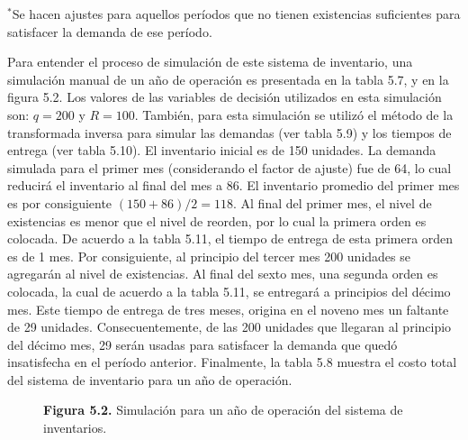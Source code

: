 \documentclass[11pt,letterpaper]{report}
\begin{document}
{\footnotesize $^{*}$Se hacen ajustes para aquellos períodos que no tienen
existencias suficientes para satisfacer la demanda de ese período.}

Para entender el proceso de simulación de este sistema de inventario, una
simulación manual de un año de operación es presentada en la tabla 5.7, y en
la figura 5.2. Los valores de las variables de decisión utilizados en esta
simulación son: $q=200$ y $R=100$. También, para esta simulación se utilizó
el método de la transformada inversa para simular las demandas (ver tabla
5.9) y los tiempos de entrega (ver tabla 5.10). El inventario inicial es de
150 unidades. La demanda simulada para el primer mes (considerando el factor
de ajuste) fue de 64, lo cual reducirá el inventario al final del mes a 86.
El inventario promedio del primer mes es por consiguiente $(150+86)/2=118$.
Al final del primer mes, el nivel de existencias es menor que el nivel de
reorden, por lo cual la primera orden es colocada. De acuerdo a la tabla
5.11, el tiempo de entrega de esta primera orden es de 1 mes. Por
consiguiente, al principio del tercer mes 200 unidades se agregarán al nivel
de existencias. Al final del sexto mes, una segunda orden es colocada, la
cual de acuerdo a la tabla 5.11, se entregará a principios del décimo mes.
Este tiempo de entrega de tres meses, origina en el noveno mes un faltante
de 29 unidades. Consecuentemente, de las 200 unidades que llegaran al
principio del décimo mes, 29 serán usadas para satisfacer la demanda que
quedó insatisfecha en el período anterior. Finalmente, la tabla 5.8 muestra
el costo total del sistema de inventario para un año de operación.

\begin{figure}[H]
\centering
{}
\caption*{\textbf{Figura 5.2.} Simulación para un año de operación del sistema de inventarios.}
\end{figure}
\end{document}
